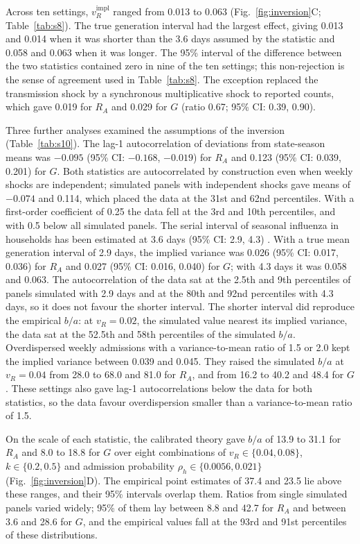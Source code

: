 Across ten settings, $v_R^{\mathrm{impl}}$ ranged from 0.013 to 0.063 (Fig.~\ref{fig:inversion}C; Table~\ref{tab:s8}). The true generation interval had the largest effect, giving 0.013 and 0.014 when it was shorter than the 3.6 days assumed by the statistic and 0.058 and 0.063 when it was longer. The 95\% interval of the difference between the two statistics contained zero in nine of the ten settings; this non-rejection is the sense of agreement used in Table~\ref{tab:s8}. The exception replaced the transmission shock by a synchronous multiplicative shock to reported counts, which gave 0.019 for $R_A$ and 0.029 for $G$ (ratio 0.67; 95\% CI: 0.39, 0.90).

Three further analyses examined the assumptions of the inversion (Table~\ref{tab:s10}). The lag-1 autocorrelation of deviations from state-season means was $-0.095$ (95\% CI: $-0.168$, $-0.019$) for $R_A$ and 0.123 (95\% CI: 0.039, 0.201) for $G$. Both statistics are autocorrelated by construction even when weekly shocks are independent; simulated panels with independent shocks gave means of $-0.074$ and 0.114, which placed the data at the 31st and 62nd percentiles. With a first-order coefficient of 0.25 the data fell at the 3rd and 10th percentiles, and with 0.5 below all simulated panels. The serial interval of seasonal influenza in households has been estimated at 3.6 days (95\% CI: 2.9, 4.3) \citep{cowling2009estimation}. With a true mean generation interval of 2.9 days, the implied variance was 0.026 (95\% CI: 0.017, 0.036) for $R_A$ and 0.027 (95\% CI: 0.016, 0.040) for $G$; with 4.3 days it was 0.058 and 0.063. The autocorrelation of the data sat at the 2.5th and 9th percentiles of panels simulated with 2.9 days and at the 80th and 92nd percentiles with 4.3 days, so it does not favour the shorter interval. The shorter interval did reproduce the empirical $b/a$: at $v_R=0.02$, the simulated value nearest its implied variance, the data sat at the 52.5th and 58th percentiles of the simulated $b/a$. Overdispersed weekly admissions with a variance-to-mean ratio of 1.5 or 2.0 kept the implied variance between 0.039 and 0.045. They raised the simulated $b/a$ at $v_R=0.04$ from 28.0 to 68.0 and 81.0 for $R_A$, and from 16.2 to 40.2 and 48.4 for $G$. These settings also gave lag-1 autocorrelations below the data for both statistics, so the data favour overdispersion smaller than a variance-to-mean ratio of 1.5.

On the scale of each statistic, the calibrated theory gave $b/a$ of 13.9 to 31.1 for $R_A$ and 8.0 to 18.8 for $G$ over eight combinations of $v_R\in\{0.04,0.08\}$, $k\in\{0.2,0.5\}$ and admission probability $\rho_h\in\{0.0056,0.021\}$ (Fig.~\ref{fig:inversion}D). The empirical point estimates of 37.4 and 23.5 lie above these ranges, and their 95\% intervals overlap them. Ratios from single simulated panels varied widely; 95\% of them lay between 8.8 and 42.7 for $R_A$ and between 3.6 and 28.6 for $G$, and the empirical values fall at the 93rd and 91st percentiles of these distributions.

